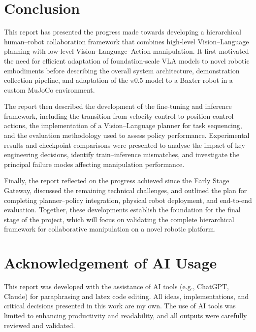 \documentclass[conference, 12pt]{IEEEtran}
\begin{document}




\section{Conclusion}

This report has presented the progress made towards developing a hierarchical human–robot collaboration framework that combines high-level Vision–Language planning with low-level Vision–Language–Action manipulation. It first motivated the need for efficient adaptation of foundation-scale VLA models to novel robotic embodiments before describing the overall system architecture, demonstration collection pipeline, and adaptation of the $\pi$0.5 model to a Baxter robot in a custom MuJoCo environment.

The report then described the development of the fine-tuning and inference framework, including the transition from velocity-control to position-control actions, the implementation of a Vision–Language planner for task sequencing, and the evaluation methodology used to assess policy performance. Experimental results and checkpoint comparisons were presented to analyse the impact of key engineering decisions, identify train–inference mismatches, and investigate the principal failure modes affecting manipulation performance.

Finally, the report reflected on the progress achieved since the Early Stage Gateway, discussed the remaining technical challenges, and outlined the plan for completing planner–policy integration, physical robot deployment, and end-to-end evaluation. Together, these developments establish the foundation for the final stage of the project, which will focus on validating the complete hierarchical framework for collaborative manipulation on a novel robotic platform.

\section{Acknowledgement of AI Usage}
This report was developed with the assistance of AI tools (e.g., ChatGPT, Claude) for paraphrasing and latex code editing. All ideas, implementations, and critical decisions presented in this work are my own. The use of AI tools was limited to enhancing productivity and readability, and all outputs were carefully reviewed and validated.


\clearpage


\end{document}
